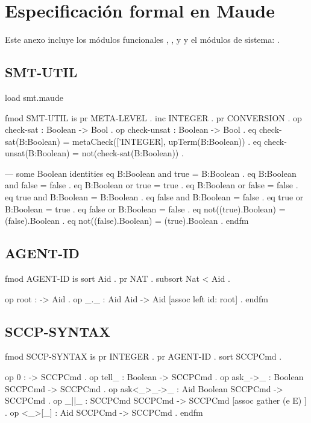 \chapter{Especificaci\'on formal en Maude}
\label{a.appendix}

Este anexo incluye los m\'odulos funcionales , ,  y  y el m\'odulos de sistema: .

\section{SMT-UTIL}
\label{smt.appendix}

\begin{maude}
load smt.maude

fmod SMT-UTIL is
  pr META-LEVEL .
  inc INTEGER .
  pr CONVERSION .
  op check-sat : Boolean -> Bool .
  op check-unsat : Boolean -> Bool .
  eq check-sat(B:Boolean)
   = metaCheck(['INTEGER], upTerm(B:Boolean)) .
  eq check-unsat(B:Boolean)
   = not(check-sat(B:Boolean)) .

  --- some Boolean identities
  eq B:Boolean and true
   = B:Boolean .
  eq B:Boolean and false
   = false .
  eq B:Boolean or true
   = true .
  eq B:Boolean or false
   = false .
  eq true and B:Boolean
   = B:Boolean .
  eq false and B:Boolean
   = false .
  eq true or B:Boolean
   = true .
  eq false or B:Boolean
   = false .
  eq not((true).Boolean)
   = (false).Boolean .
  eq not((false).Boolean)
   = (true).Boolean .
endfm
\end{maude}

\section{AGENT-ID}
\label{aid.appendix}

\begin{maude}
fmod AGENT-ID is
  sort Aid .
  pr NAT .
  subsort Nat < Aid .

  op root : -> Aid .
  op _._ : Aid Aid -> Aid [assoc left id: root] .
endfm
\end{maude}

\section{SCCP-SYNTAX}
\label{syntax.appendix}

\begin{maude}
fmod SCCP-SYNTAX is
  pr INTEGER .
  pr AGENT-ID .
  sort SCCPCmd .

  op 0 : -> SCCPCmd . 
  op tell_ : Boolean -> SCCPCmd . 
  op ask_->_ : Boolean SCCPCmd -> SCCPCmd .
  op ask<_>_->_ : Aid Boolean SCCPCmd -> SCCPCmd .
  op _||_ : SCCPCmd SCCPCmd -> SCCPCmd [assoc gather (e E) ] .
  op <_>[_] : Aid SCCPCmd -> SCCPCmd .
endfm
\end{maude}

